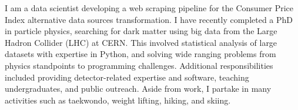 
\begin{cvparagraph}
I am a data scientist developing a web scraping pipeline for the Consumer Price Index alternative data sources transformation. I have recently completed a PhD in particle physics, searching for dark matter using big data from the Large Hadron Collider (LHC) at CERN. This involved statistical analysis of large datasets with expertise in Python, and solving wide ranging problems from physics standpoints to programming challenges. Additional responsibilities included providing detector-related expertise and software, teaching undergraduates, and public outreach. Aside from work, I partake in many activities such as taekwondo, weight lifting, hiking, and skiing.
\end{cvparagraph}
